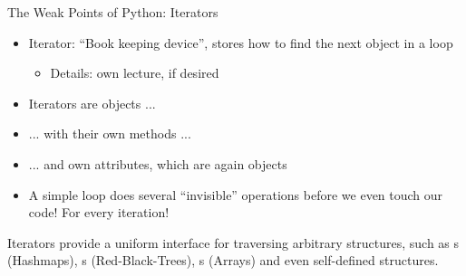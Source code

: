 \begin{frame}[fragile]{The Weak Points of Python: Iterators}
%
\begin{itemize}
\item Iterator: \enquote{Book keeping device}, stores how to find the next object in a loop
	\begin{itemize}
	\item Details: own lecture, if desired
	\end{itemize}
\item Iterators are objects ...
\item ... with their own methods ...
\item ... and own attributes, which are again objects
\item[\Thus] A simple  loop does several \enquote{invisible} operations before we even touch our code! For every iteration!
\end{itemize}
%
\begin{hintbox}
Iterators provide a uniform interface for traversing arbitrary structures, such as s (Hashmaps), s (Red-Black-Trees), s (Arrays) and even self-defined structures.
\end{hintbox}
%
\end{frame}


